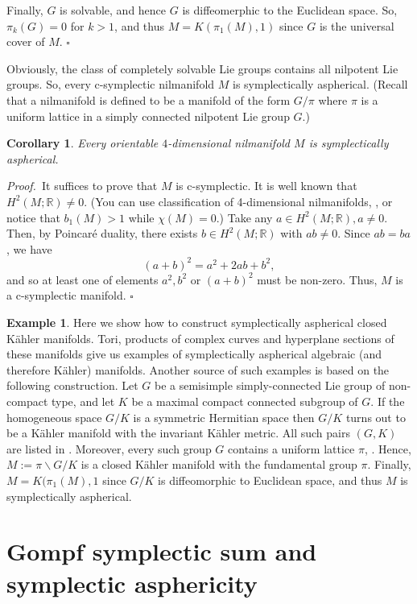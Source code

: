 \documentclass[12pt, twoside]{amsart}
\theoremstyle{plain}
\newtheorem{cory}[theorem]{Corollary}
\theoremstyle{definition}
\newtheorem{example}[theorem]{Example}
\numberwithin{equation}{section}
\def\RR{\mathbb R}
\def\hqed{\hfill\hfill$\square$}
\def\RR{\mathbb R}
\def\m{\medskip}
\def\p{{\it Proof.\ }}
\begin{document}
Finally, $G$ is solvable, and hence $G$ is diffeomerphic to the Euclidean 
space. 
So, $\pi_k(G)=0$ for $k>1$, and thus $M=K(\pi_1(M),1)$ since $G$ is the 
universal cover of $M$. 
\hqed

\m Obviously, the class of completely solvable Lie groups contains all
nilpotent Lie groups. So, every c-symplectic nilmanifold $M$ 
is symplectically aspherical. (Recall that a nilmanifold is defined to be a 
manifold of the form $G/\pi$ where $\pi$ is a uniform lattice in a simply 
connected nilpotent Lie group $G$.)


\begin{cory}\label{4nil-aspher}
Every orientable $4$-dimensional nilmanifold $M$ is symplectically aspherical.
\end{cory}

\p It suffices to prove that $M$ is c-symplectic. It is well known that 
$H^2(M;\RR)\ne 0$. (You can use 
classification of 4-dimensional nilmanifolds, \cite{VGS}, or notice that 
$b_1(M)>1$ while 
$\chi(M)=0$.)   
Take any $a\in H^2(M;\RR), a\ne 0$. Then, by Poincar\'e duality, there exists 
$b\in 
H^2(M;\RR)$ with $ab\ne 0$. Since $ab=ba$, we have
$$
(a+b)^2=a^2+2ab+b^2,
$$
and so at least one of elements $a^2, b^2$ or $(a+b)^2$ must be non-zero. 
Thus, 
$M$ is a c-symplectic manifold.
\hqed


\begin{example}\label{ex-kahlerman}
 Here we show how to construct symplectically aspherical closed K\"ahler 
manifolds. Tori, products of complex curves and hyperplane sections of 
these manifolds give us examples of symplectically aspherical algebraic (and 
therefore K\"ahler) manifolds. Another source of such examples is based on the 
following construction. Let $G$ be a semisimple simply-connected Lie group of 
non-compact type, and let $K$ be a maximal compact connected subgroup of $G$. If 
the homogeneous space $G/K$ is a  symmetric Hermitian space then $G/K$ turns out to be a K\"ahler manifold with the invariant K\"ahler metric. All such pairs 
$(G,K)$ are listed in \cite[Ch. IX]{He}. Moreover, every such group $G$ contains 
a uniform lattice $\pi$, \cite{VGS}. Hence, $M:=\pi\backslash G/K$ is a closed 
K\"ahler manifold with the fundamental group $\pi$. Finally, $M=K(\pi_1(M),1$ 
since $G/K$ is diffeomorphic to Euclidean space, and thus $M$ is symplectically 
aspherical.
\end{example} 

\section{Gompf symplectic sum and symplectic asphericity}\label{sec-sum}
\end{document}
